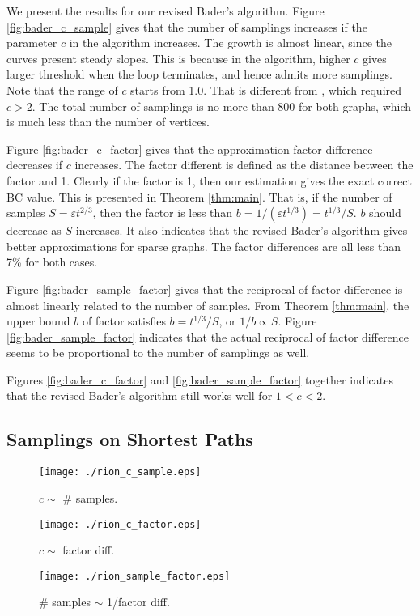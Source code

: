 \documentclass[10pt]{article}
\begin{document}
We present the results for our revised Bader's algorithm. 
Figure \ref{fig:bader_c_sample} gives that the number of samplings increases if the parameter $c$ in the algorithm increases. The growth is almost linear, since the curves present steady slopes. This is because in the algorithm, higher $c$ gives larger threshold when the loop terminates, and hence admits more samplings. Note that the range of $c$ starts from 1.0. That is different from \cite{bader2007approximating}, which required $c>2$. The total number of samplings is no more than 800 for both graphs, which is much less than the number of vertices.

Figure \ref{fig:bader_c_factor} gives that the approximation factor difference decreases if $c$ increases. The factor different is defined as the distance between the factor and 1. Clearly if the factor is 1, then our estimation gives the exact correct BC value. This is presented in Theorem \ref{thm:main}. That is, if the number of samples $S=\varepsilon t^{2/3}$, then the factor is less than $b = 1/(\varepsilon t^{1/3}) = t^{1/3}/S$. $b$ should decrease as $S$ increases. It also indicates that the revised Bader's algorithm gives better approximations for sparse graphs. The factor differences are all less than 7\% for both cases.

Figure \ref{fig:bader_sample_factor} gives that the reciprocal of factor difference is almost linearly related to the number of samples. From Theorem \ref{thm:main}, the upper bound $b$ of factor satisfies $b = t^{1/3}/S$, or $1/b \propto S$. Figure \ref{fig:bader_sample_factor} indicates that the actual reciprocal of factor difference seems to be proportional to the number of samplings as well. 

Figures \ref{fig:bader_c_factor} and \ref{fig:bader_sample_factor} together indicates that the revised Bader's algorithm still works well for $1<c<2$.

\subsection{Samplings on Shortest Paths}

\begin{figure*}[!t]
\centering
\begin{minipage}[t]{0.3\textwidth}
\centering
\texttt{[image: ./rion\_c\_sample.eps]}
\caption{$c \sim$ \# samples.}
\label{fig:rion_c_sample}
\end{minipage}
\hspace{10pt}
\begin{minipage}[t]{0.3\textwidth}
\centering
\texttt{[image: ./rion\_c\_factor.eps]}
\caption{$c \sim$ factor diff.}
\label{fig:rion_c_factor}
\end{minipage}
\hspace{10pt}
\begin{minipage}[t]{0.3\textwidth}
\centering
\texttt{[image: ./rion\_sample\_factor.eps]}
\caption{\# samples $\sim$ 1/factor diff.}
\label{fig:rion_sample_factor}
\end{minipage}
\end{figure*}
\end{document}
